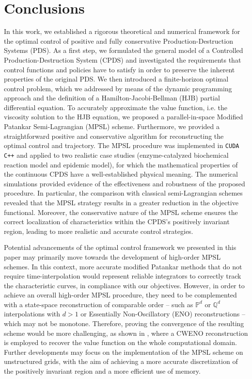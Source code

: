 \documentclass[10pt]{article}
\theoremstyle{remark}
\theoremstyle{definition}
\theoremstyle{remark}
\begin{document}
\section{Conclusions}\label{sec:Conclusions}
In this work, we established a rigorous theoretical and numerical framework for the optimal control of positive and fully conservative Production-Destruction Systems (PDS). As a first step, we formulated the general model of a Controlled Production-Destruction System (CPDS) and investigated the requirements that control functions and policies have to satisfy in order to preserve the inherent properties of the original PDS. We then introduced a finite-horizon optimal control problem, which we addressed by means of the dynamic programming approach and the definition of a Hamilton-Jacobi-Bellman (HJB) partial differential equation. To accurately approximate the value function, i.e. the viscosity solution to the HJB equation, we proposed a parallel-in-space Modified Patankar Semi-Lagrangian (MPSL) scheme. Furthermore, we provided a straightforward positive and conservative algorithm for reconstructing the optimal control and trajectory. The MPSL procedure was implemented in \texttt{CUDA C++} and applied to two realistic case studies (enzyme-catalyzed biochemical reaction model and epidemic model), for which the mathematical properties of the continuous CPDS have a well-established physical meaning.  The numerical simulations provided evidence of the effectiveness and robustness of the proposed procedure. In particular, the comparison with classical semi-Lagrangian schemes revealed that the MPSL strategy results in a greater reduction in the objective functional. Moreover, the conservative nature of the MPSL scheme ensures the correct localization of characteristics within the CPDS's positively invariant region, leading to more realistic and accurate control strategies.

Potential advancements of the optimal control framework we presented in this paper may primarily move towards the development of high-order MPSL schemes.  In this context, more accurate modified Patankar methods that do not require time-interpolation would represent reliable integrators to correctly track the characteristic curves, in compliance with our objectives. However, in order to achieve an overall high-order MPSL procedure, they need to be complemented with a state-space reconstruction of comparable order -- such as $\mathbb{P}^d$ or $\mathbb{Q}^d$ interpolations with $d>1$ or Essentially Non-Oscillatory (ENO) reconstructions -- which may not be monotone. Therefore, proving the convergence of the resulting scheme would be more challenging, as shown in \cite{CFPS24}, where a CWENO reconstruction is employed to recover the value function on the whole computational domain. Further developments may focus on the implementation of the MPSL scheme on unstructured grids, with the aim of achieving a more accurate discretization of the positively invariant region and a more efficient use of memory.
\end{document}
